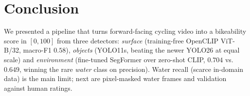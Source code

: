 \documentclass[letterpaper,journal]{IEEEtran}
\begin{document}

\section{Conclusion}
We presented a pipeline that turns forward-facing cycling video into a bikeability
score in $[0,100]$ from three detectors: \emph{surface} (training-free OpenCLIP
ViT-B/32, macro-F1 $0.58$), \emph{objects} (YOLO11s, beating the newer YOLO26 at equal
scale) and \emph{environment} (fine-tuned SegFormer over zero-shot CLIP, $0.704$ vs.\
$0.649$, winning the rare \emph{water} class on precision). Water recall (scarce
in-domain data) is the main limit; next are pixel-masked water frames and validation
against human ratings.




\end{document}
